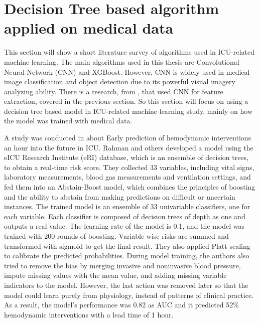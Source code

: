 \documentclass[12pt,a4paper,english
]{tunithesis}
\begin{document}
\section{Decision Tree based algorithm applied on medical data}
This section will show a short literature survey of algorithms used in ICU-related machine learning. The main algorithms used in this thesis are Convolutional Neural Network (CNN) and XGBoost. However, CNN is widely used in medical image classification and object detection due to its powerful visual imagery analyzing ability. There is a research, from \textcite{asuroglu2021}, that used CNN for feature extraction, covered in the previous section. So this section will focus on using a decision tree based model in ICU-related machine learning study, mainly on how the model was trained with medical data.

A study was conducted in \textcite{rahman2021} about Early prediction of hemodynamic interventions an hour into the future in ICU. Rahman and others developed a model using the eICU Research Institute (eRI) database, which is an ensemble of decision trees, to obtain a real-time risk score. They collected 33 variables, including vital signs, laboratory measurements, blood gas measurements and ventilation settings, and fed them into an Abstain-Boost model, which combines the principles of boosting and the ability to abstain from making predictions on difficult or uncertain instances. The trained model is an ensemble of 33 univariable classifiers, one for each variable. Each classifier is composed of decision trees of depth as one and outputs a real value. The learning rate of the model is 0.1, and the model was trained with 200 rounds of boosting. Variable-wise risks are summed and transformed with sigmoid to get the final result. They also applied Platt scaling to calibrate the predicted probabilities. During model training, the authors also tried to remove the bias by merging invasive and noninvasive blood pressure, impute missing values with the mean value, and adding missing variable indicators to the model. However, the last action was removed later so that the model could learn purely from physiology, instead of patterns of clinical practice. As a result, the model's performance was 0.82 as AUC and it predicted 52\% hemodynamic interventions with a lead time of 1 hour.
\end{document}
